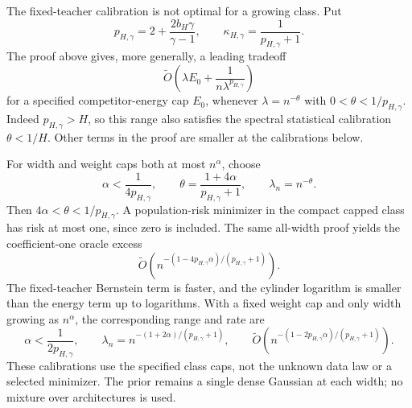 The fixed-teacher calibration is not optimal for a growing class.  Put
\[
 p_{H,\gamma}=2+\frac{2b_H\gamma}{\gamma-1},
 \qquad \kappa_{H,\gamma}=\frac1{p_{H,\gamma}+1}.
\]
The proof above gives, more generally, a leading tradeoff
\[
 \widetilde O\left(\lambda E_0+
                  \frac1{n\lambda^{p_{H,\gamma}}}\right)
\]
for a specified competitor-energy cap $E_0$, whenever
$\lambda=n^{-\theta}$ with $0<\theta<1/p_{H,\gamma}$.
Indeed $p_{H,\gamma}>H$, so this range also satisfies the spectral
statistical calibration $\theta<1/H$.  Other terms in the proof are
smaller at the calibrations below.

For width and weight caps both at most $n^\alpha$, choose
\[
 \alpha<\frac1{4p_{H,\gamma}},\qquad
 \theta=\frac{1+4\alpha}{p_{H,\gamma}+1},\qquad
 \lambda_n=n^{-\theta}.
\]
Then $4\alpha<\theta<1/p_{H,\gamma}$.  A population-risk minimizer in
the compact capped class has risk at most one, since zero is included.
The same all-width proof yields the coefficient-one oracle excess
\[
 \widetilde O\left(n^{-(1-4p_{H,\gamma}\alpha)/(p_{H,\gamma}+1)}\right).
\]
The fixed-teacher Bernstein term is faster, and the cylinder logarithm
is smaller than the energy term up to logarithms.  With a fixed weight
cap and only width growing as $n^\alpha$, the corresponding range and
rate are
\[
 \alpha<\frac1{2p_{H,\gamma}},\qquad
 \lambda_n=n^{-(1+2\alpha)/(p_{H,\gamma}+1)},\qquad
 \widetilde O\left(n^{-(1-2p_{H,\gamma}\alpha)/(p_{H,\gamma}+1)}\right).
\]
These calibrations use the specified class caps, not the unknown data
law or a selected minimizer.  The prior remains a single dense
Gaussian at each width; no mixture over architectures is used.

